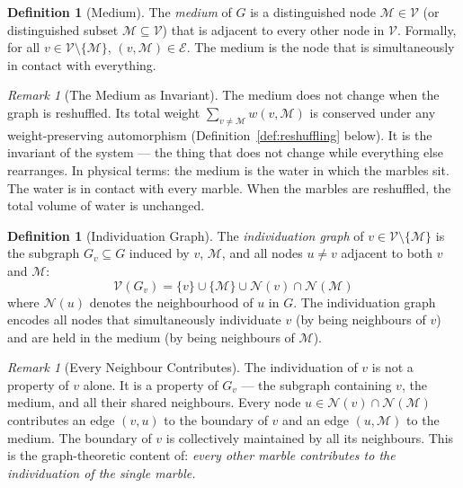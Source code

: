 \documentclass[11pt,twocolumn,a4paper]{article}
\theoremstyle{plain}
\theoremstyle{definition}
\newtheorem{definition}[theorem]{Definition}
\theoremstyle{remark}
\newtheorem{remark}[theorem]{Remark}
\newcommand{\med}{\mathcal{M}}
\newcommand{\Nbd}{\mathcal{N}}
\newcommand{\Ecal}{\mathcal{E}}
\newcommand{\Vcal}{\mathcal{V}}
\begin{document}
\begin{definition}[Medium]
\label{def:medium}
The \emph{medium} of $G$ is a distinguished node $\med \in \Vcal$ (or
distinguished subset $\med \subseteq \Vcal$) that is adjacent to every
other node in $\Vcal$. Formally, for all $v \in \Vcal \setminus \{\med\}$,
$(v, \med) \in \Ecal$. The medium is the node that is simultaneously in
contact with everything.
\end{definition}

\begin{remark}[The Medium as Invariant]
\label{rem:medium_invariant}
The medium does not change when the graph is reshuffled. Its total weight
$\sum_{v \neq \med} w(v, \med)$ is conserved under any weight-preserving
automorphism (Definition~\ref{def:reshuffling} below). It is the invariant
of the system --- the thing that does not change while everything else
rearranges. In physical terms: the medium is the water in which the marbles
sit. The water is in contact with every marble. When the marbles are
reshuffled, the total volume of water is unchanged.
\end{remark}

\begin{definition}[Individuation Graph]
\label{def:indgraph}
The \emph{individuation graph} of $v \in \Vcal \setminus \{\med\}$ is the
subgraph $G_v \subseteq G$ induced by $v$, $\med$, and all nodes $u \neq v$
adjacent to both $v$ and $\med$:
\[
  \Vcal(G_v) = \{v\} \cup \{\med\} \cup \Nbd(v) \cap \Nbd(\med)
\]
where $\Nbd(u)$ denotes the neighbourhood of $u$ in $G$. The individuation
graph encodes all nodes that simultaneously individuate $v$ (by being
neighbours of $v$) and are held in the medium (by being neighbours of $\med$).
\end{definition}

\begin{remark}[Every Neighbour Contributes]
\label{rem:collective}
The individuation of $v$ is not a property of $v$ alone. It is a property
of $G_v$ --- the subgraph containing $v$, the medium, and all their shared
neighbours. Every node $u \in \Nbd(v) \cap \Nbd(\med)$ contributes an edge
$(v,u)$ to the boundary of $v$ and an edge $(u, \med)$ to the medium. The
boundary of $v$ is collectively maintained by all its neighbours. This is
the graph-theoretic content of: \emph{every other marble contributes to the
individuation of the single marble.}
\end{remark}

\end{document}
